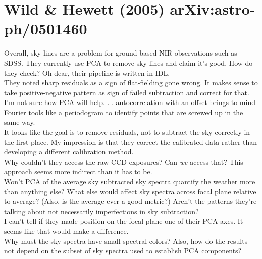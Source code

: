 \documentclass[12pt]{article}
\newcommand{\textul}{\underline}
\begin{document}
\section*{Wild \& Hewett (2005) arXiv:astro-ph/0501460}
Overall, sky lines are a problem for ground-based NIR observations such as SDSS.  They currently use PCA to remove sky lines and claim it's good.  How do they check?  Oh dear, their pipeline is written in IDL.\\
They noted sharp residuals as a sign of flat-fielding gone wrong.  It makes sense to take positive-negative pattern as sign of failed subtraction and correct for that.  I'm not sure how PCA will help. . . autocorrelation with an offset brings to mind Fourier tools like a periodogram to identify points that are screwed up in the same way.\\
It looks like the goal is to remove residuals, not to subtract the sky correctly in the first place.  My impression is that they correct the calibrated data rather than developing a different calibration method. \\
Why couldn't they access the raw CCD exposures? Can \textit{we} access that? This approach seems more indirect than it has to be.\\
Won't PCA of the average sky subtracted sky spectra quantify the weather more than anything else? What else would affect sky spectra across focal plane relative to average? (Also, is the average ever a good metric?)  Aren't the patterns they're talking about not necessarily imperfections in sky subtraction?\\
I can't tell if they made position on the focal plane one of their PCA axes.  It seems like that would make a difference.\\
Why must the sky spectra have small spectral colors?  Also, how do the results not depend on the subset of sky spectra used to establish PCA components?\\
\end{document}
